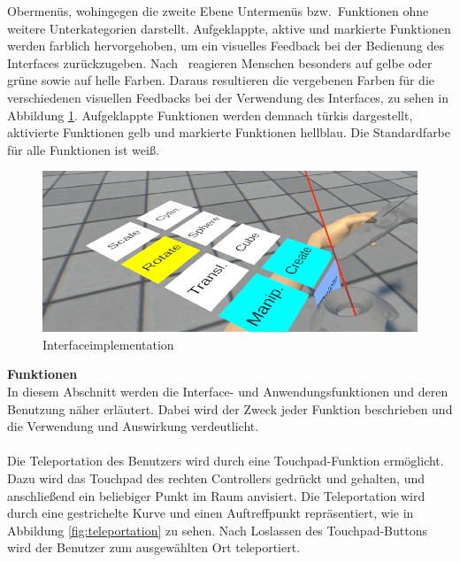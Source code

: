 Obermenüs, wohingegen die zweite Ebene Untermenüs bzw.~Funktionen ohne weitere Unterkategorien darstellt. Aufgeklappte, aktive und markierte Funktionen werden farblich hervorgehoben, um ein visuelles Feedback bei der Bedienung des Interfaces zurückzugeben. Nach~\citep{colors} reagieren Menschen besonders auf gelbe oder grüne sowie auf helle Farben. Daraus resultieren die vergebenen Farben für die verschiedenen visuellen Feedbacks bei der Verwendung des Interfaces, zu sehen in Abbildung \ref{fig:interfaceimp}. Aufgeklappte Funktionen werden demnach türkis dargestellt, aktivierte Funktionen gelb und markierte Funktionen hellblau. Die Standardfarbe für alle Funktionen ist weiß.

\begin{figure}[h]
\captionsetup{width=.7\linewidth}
\includegraphics[scale=0.6]{Bilder/Hauptteil/Bearbeitet/Interface}
\centering
\caption{Interfaceimplementation}
\label{fig:interfaceimp}
\end{figure}


\noindent \textbf{Funktionen}\\
In diesem Abschnitt werden die Interface- und Anwendungsfunktionen und deren Benutzung näher erläutert. Dabei wird der Zweck jeder Funktion beschrieben und die Verwendung und Auswirkung verdeutlicht.\\
\\
Die Teleportation des Benutzers wird durch eine Touchpad-Funktion ermöglicht. Dazu wird das Touchpad des rechten Controllers gedrückt und gehalten, und anschließend ein beliebiger Punkt im Raum anvisiert. Die Teleportation wird durch eine gestrichelte Kurve und einen Auftreffpunkt repräsentiert, wie in Abbildung \ref{fig:teleportation} zu sehen. Nach Loslassen des Touchpad-Buttons wird der Benutzer zum ausgewählten Ort teleportiert.

